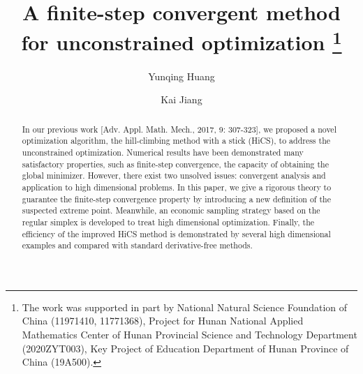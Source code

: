 \DeclareMathOperator*{\argmin}{\mathrm{argmin}}
\DeclareMathOperator*{\argmax}{\mathrm{argmax}}

%

	
	\title{A finite-step convergent method for unconstrained optimization
		\thanks{The work was supported in part by National Natural Science Foundation
		of China (11971410, 11771368), 
	Project for Hunan National Applied Mathematics Center of Hunan
	Provincial Science and Technology Department (2020ZYT003),
		Key Project of Education
Department of Hunan Province of China (19A500).}}
	
	
	
	\author{Yunqing Huang \and  Kai Jiang%
	}
	
	
	
	


\maketitle
\begin{abstract}
In our previous work [Adv. Appl. Math. Mech., 2017, 9: 307-323], we proposed a
novel optimization algorithm, the hill-climbing method with a stick (HiCS), to
address the unconstrained optimization. Numerical results have been demonstrated
many satisfactory properties, such as finite-step convergence, the capacity of
obtaining the global minimizer. However, there exist two unsolved issues:
convergent analysis and application to high dimensional problems.  In this
paper, we give a rigorous theory to guarantee the finite-step convergence
property by introducing a new definition of the suspected extreme point.
Meanwhile, an economic sampling strategy based on the regular simplex is
developed to treat high dimensional optimization. Finally, the efficiency of the
improved HiCS method is demonstrated by several high dimensional examples and
compared with standard derivative-free methods.

\end{abstract}

